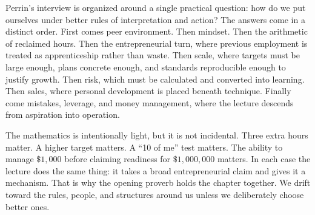 Perrin's interview is organized around a single practical question: how do we put ourselves under better rules of interpretation and action? The answers come in a distinct order. First comes peer environment. Then mindset. Then the arithmetic of reclaimed hours. Then the entrepreneurial turn, where previous employment is treated as apprenticeship rather than waste. Then scale, where targets must be large enough, plans concrete enough, and standards reproducible enough to justify growth. Then risk, which must be calculated and converted into learning. Then sales, where personal development is placed beneath technique. Finally come mistakes, leverage, and money management, where the lecture descends from aspiration into operation.

The mathematics is intentionally light, but it is not incidental. Three extra hours matter. A higher target matters. A ``10 of me'' test matters. The ability to manage \(\$1{,}000\) before claiming readiness for \(\$1{,}000{,}000\) matters. In each case the lecture does the same thing: it takes a broad entrepreneurial claim and gives it a mechanism. That is why the opening proverb holds the chapter together. We drift toward the rules, people, and structures around us unless we deliberately choose better ones.